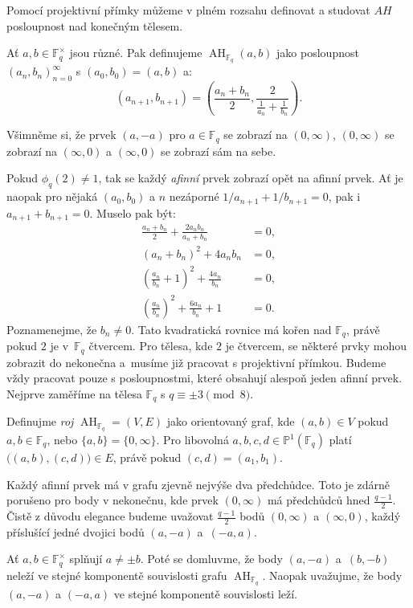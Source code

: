 \documentclass[12pt]{report}
\DeclareMathOperator{\AH}{AH}
\begin{document}
Pomocí projektivní přímky můžeme v plném rozsahu definovat a studovat $AH$ posloupnost nad konečným tělesem.

\begin{definice}
Ať $a,b \in \mathbb{F}_q ^{\times}$ jsou různé. Pak definujeme $\AH_{\mathbb{F}_q}(a,b)$ jako posloupnost $(a_n,b_n)_{n=0}^{\infty}$ s $(a_0,b_0) = (a,b)$ a:
\begin{equation*}
\left(a_{n+1},b_{n+1} \right) = \left(\frac{a_n+b_n}{2}, \frac{2}{\frac{1}{a_n} + \frac{1}{b_n}} \right).
\end{equation*}
\end{definice}

Všimněme si, že prvek $(a,-a)$ pro $a \in \mathbb{F}_q$ se zobrazí na $(0,\infty)$, $(0,\infty)$ se zobrazí na $(\infty,0)$ a $(\infty,0)$ se zobrazí sám na sebe. 

Pokud $\phi_q(2) \neq 1$, tak se každý \textit{afinní} prvek zobrazí opět na afinní prvek. Ať je naopak pro nějaká $(a_0,b_0)$ a $n$ nezáporné $1/a_{n+1} + 1/b_{n+1} = 0$, pak i $a_{n+1} + b_{n+1} = 0$. Muselo pak být:
\begin{align*}
\frac{a_n+b_n}{2} + \frac{2 a_n b_n}{a_n + b_n} &= 0,\\
(a_n+b_n)^2 + 4 a_n b_n &= 0,\\
\left(\frac{a_n}{b_n} + 1 \right)^2 + \frac{4a_n}{b_n} &= 0,\\
\left(\frac{a_n}{b_n}\right)^2 + \frac{6a_n}{b_n} + 1 &= 0.
\end{align*}
Poznamenejme, že $b_n \neq 0$. Tato kvadratická rovnice má kořen nad $\mathbb{F}_q$, právě pokud $2$ je v~$\mathbb{F}_q$ čtvercem. Pro tělesa, kde $2$ je čtvercem, se některé prvky mohou zobrazit do nekonečna a~musíme již pracovat s projektivní přímkou. Budeme vždy pracovat pouze s posloupnostmi, které obsahují alespoň jeden afinní prvek. Nejprve zaměříme na tělesa $\mathbb{F}_q$ s $q \equiv \pm 3 \pmod{8}$.

\begin{definice}
Definujme \textit{roj} $\AH_{\mathbb{F}_q} = (V,E)$ jako orientovaný graf, kde $(a,b) \in V$ pokud $a,b \in \mathbb{F}_q$, nebo $\lbrace a,b \rbrace = \lbrace 0,\infty \rbrace$. Pro libovolná $a,b,c,d \in \mathbb{P}^1 (\mathbb{F}_q)$ platí $\Big((a,b), (c,d) \Big) \in E$, právě pokud $(c,d) = (a_1,b_1)$. 
\end{definice}
Každý afinní prvek má v grafu zjevně nejvýše dva předchůdce. Toto je zdárně porušeno pro body v nekonečnu, kde prvek $(0,\infty)$ má předchůdců hned $\frac{q-1}{2}$. Čistě z důvodu elegance budeme uvažovat $\frac{q-1}{2}$ bodů $(0,\infty)$ a $(\infty,0)$, každý příslušící jedné dvojici bodů $(a,-a)$ a~$(-a,a)$. 
\begin{umluva}
Ať $a,b \in \mathbb{F}_q ^{\times}$ splňují $a \neq \pm b$. Poté se domluvme, že body $(a,-a)$ a~$(b,-b)$ neleží ve stejné komponentě souvislosti grafu $\AH_{\mathbb{F}_q}$. Naopak uvažujme, že body $(a,-a)$ a $(-a,a)$ ve stejné komponentě souvislosti leží.
\end{umluva}
\end{document}
